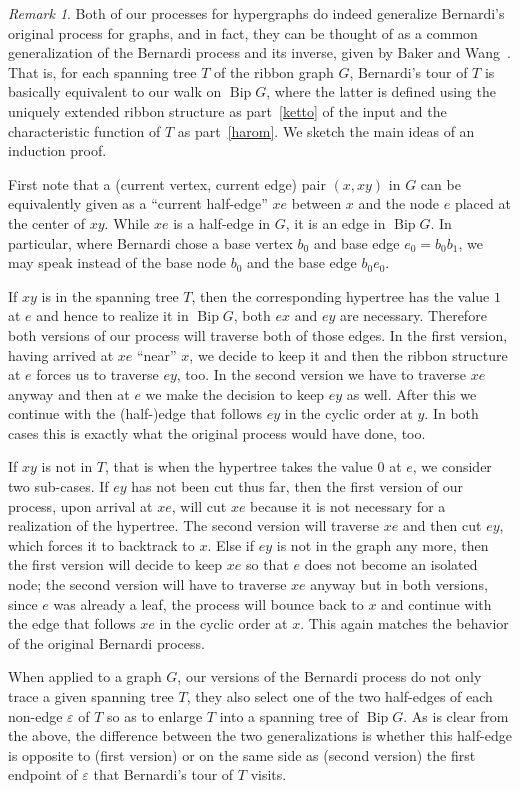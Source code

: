 \documentclass[10pt]{amsart}
\theoremstyle{definition}\newtheorem{defi}[theo]{Definition}
\theoremstyle{remark}\newtheorem{rema}[theo]{Remark}
\DeclareMathOperator{\bip}{Bip}
\begin{document}
\begin{rema}
\label{rem:altalanosit}
Both of our processes for hypergraphs do indeed generalize Bernardi's original process for graphs, and in fact, they can be thought of as a common generalization of the Bernardi process and its inverse, given by Baker and Wang~\cite{Baker-Wang}. That is, for each spanning tree $T$ of the ribbon graph $G$, Bernardi's tour of $T$ is basically equivalent to our walk on $\bip G$, where the latter is defined using the uniquely extended ribbon structure as part~\ref{ketto} of the input and the characteristic function of $T$ as part~\ref{harom}. We sketch the main ideas of an induction proof. 

First note that a (current vertex, current edge) pair $(x,xy)$ in $G$ can be equivalently given as a ``current half-edge'' $xe$ between $x$ and the node $e$ placed at the center of $xy$. While $xe$ is a half-edge in $G$, it is an edge in $\bip G$. In particular, where Bernardi chose a base vertex $b_0$ and base edge $e_0=b_0b_1$, we may speak instead of the base node $b_0$ and the base edge $b_0e_0$.

If $xy$ is in the spanning tree $T$, then the corresponding hypertree has the value $1$ at $e$ and hence to realize it in $\bip G$, both $ex$ and $ey$ are necessary. Therefore both versions of our process will traverse both of those edges. In the first version, having arrived at $xe$ ``near'' $x$, we decide to keep it and then the ribbon structure at $e$ forces us to traverse $ey$, too. In the second version we have to traverse $xe$ anyway and then at $e$ we make the decision to keep $ey$ as well. After this we continue with the (half-)edge that follows $ey$ in the cyclic order at $y$. In both cases this is exactly what the original process would have done, too. 

If $xy$ is not in $T$, that is when the hypertree takes the value $0$ at $e$, we consider two sub-cases. If $ey$ has not been cut thus far, then the first version of our process, upon arrival at $xe$, will cut $xe$ because it is not necessary for a realization of the hypertree. The second version will traverse $xe$ and then cut $ey$, which forces it to backtrack to $x$. Else if $ey$ is not in the graph any more, then the first version will decide to keep $xe$ so that $e$ does not become an isolated node; the second version will have to traverse $xe$ anyway but in both versions, since $e$ was already a leaf, the process will bounce back to $x$ and continue with the edge that follows $xe$ in the cyclic order at $x$. This again matches the behavior of the original Bernardi process.

When applied to a graph $G$, our versions of the Bernardi process do not only trace a given spanning tree $T$, they also select one of the two half-edges of each non-edge $\varepsilon$ of $T$ so as to enlarge $T$ into a spanning tree of $\bip G$. As is clear from the above, the difference between the two generalizations is whether this half-edge is opposite to (first version) or on the same side as (second version) the first endpoint of $\varepsilon$ that Bernardi's tour of $T$ visits.
\end{rema}
\end{document}
